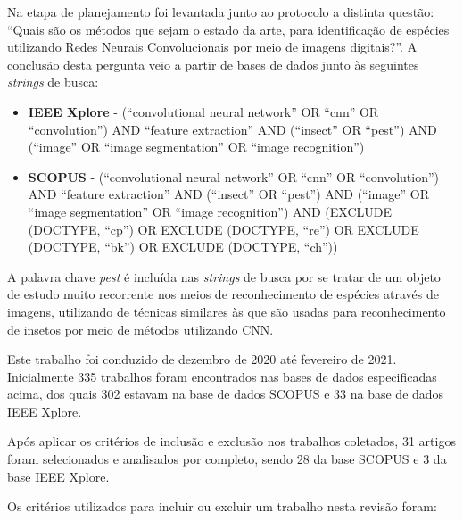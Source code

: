 \documentclass[
	12pt,				%
	oneside,			%
	a4paper,			%
	english,			%
	brazil				%
	]{abntex2ppgsi}
\begin{document}
Na etapa de planejamento foi levantada junto ao protocolo a distinta questão:
``Quais são os métodos que sejam o estado da arte, para identificação de espécies utilizando Redes Neurais Convolucionais por meio de imagens digitais?''.
A conclusão desta pergunta veio a partir de bases de dados junto às seguintes \textit{strings} de busca:

\begin{itemize}
  \item \textbf{IEEE Xplore} - (``convolutional neural network'' OR ``cnn'' OR ``convolution'') AND ``feature extraction'' AND (``insect'' OR ``pest'') AND (``image'' OR ``image segmentation'' OR ``image recognition'')
  \item \textbf{SCOPUS} - (``convolutional neural network'' OR ``cnn'' OR ``convolution'') AND ``feature extraction'' AND (``insect'' OR ``pest'') AND (``image'' OR ``image segmentation'' OR ``image recognition'') AND (EXCLUDE (DOCTYPE, ``cp'') OR EXCLUDE (DOCTYPE, ``re'') OR EXCLUDE (DOCTYPE, ``bk'') OR EXCLUDE (DOCTYPE, ``ch''))
\end{itemize}

A palavra chave \textit{pest} é incluída nas \textit{strings} de busca por se tratar de um objeto de estudo muito recorrente nos meios de reconhecimento de espécies através de imagens, utilizando de técnicas similares às que são usadas para reconhecimento de insetos por meio de métodos utilizando CNN.

Este trabalho foi conduzido de dezembro de 2020 até fevereiro de 2021. Inicialmente 335 trabalhos foram encontrados nas bases de dados especificadas acima, dos quais 302 estavam na base de dados SCOPUS e 33 na base de dados IEEE Xplore.

Após aplicar os critérios de inclusão e exclusão nos trabalhos coletados, 31 artigos foram selecionados e analisados por completo, sendo 28 da base SCOPUS e 3 da base IEEE Xplore.

Os critérios utilizados para incluir ou excluir um trabalho nesta revisão foram:
\end{document}

